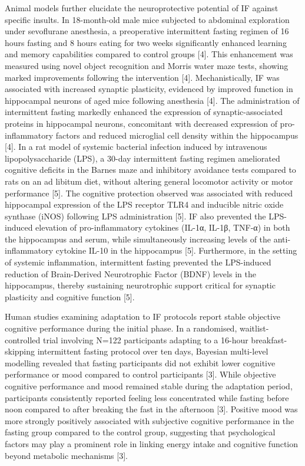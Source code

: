 \documentclass[conference]{IEEEtran}
\begin{document}
Animal models further elucidate the neuroprotective potential of IF against specific insults. In 18-month-old male mice subjected to abdominal exploration under sevoflurane anesthesia, a preoperative intermittent fasting regimen of 16 hours fasting and 8 hours eating for two weeks significantly enhanced learning and memory capabilities compared to control groups [4]. This enhancement was measured using novel object recognition and Morris water maze tests, showing marked improvements following the intervention [4]. Mechanistically, IF was associated with increased synaptic plasticity, evidenced by improved function in hippocampal neurons of aged mice following anesthesia [4]. The administration of intermittent fasting markedly enhanced the expression of synaptic-associated proteins in hippocampal neurons, concomitant with decreased expression of pro-inflammatory factors and reduced microglial cell density within the hippocampus [4]. In a rat model of systemic bacterial infection induced by intravenous lipopolysaccharide (LPS), a 30-day intermittent fasting regimen ameliorated cognitive deficits in the Barnes maze and inhibitory avoidance tests compared to rats on an ad libitum diet, without altering general locomotor activity or motor performance [5]. The cognitive protection observed was associated with reduced hippocampal expression of the LPS receptor TLR4 and inducible nitric oxide synthase (iNOS) following LPS administration [5]. IF also prevented the LPS-induced elevation of pro-inflammatory cytokines (IL-1α, IL-1β, TNF-α) in both the hippocampus and serum, while simultaneously increasing levels of the anti-inflammatory cytokine IL-10 in the hippocampus [5]. Furthermore, in the setting of systemic inflammation, intermittent fasting prevented the LPS-induced reduction of Brain-Derived Neurotrophic Factor (BDNF) levels in the hippocampus, thereby sustaining neurotrophic support critical for synaptic plasticity and cognitive function [5].

Human studies examining adaptation to IF protocols report stable objective cognitive performance during the initial phase. In a randomised, waitlist-controlled trial involving N=122 participants adapting to a 16-hour breakfast-skipping intermittent fasting protocol over ten days, Bayesian multi-level modelling revealed that fasting participants did not exhibit lower cognitive performance or mood compared to control participants [3]. While objective cognitive performance and mood remained stable during the adaptation period, participants consistently reported feeling less concentrated while fasting before noon compared to after breaking the fast in the afternoon [3]. Positive mood was more strongly positively associated with subjective cognitive performance in the fasting group compared to the control group, suggesting that psychological factors may play a prominent role in linking energy intake and cognitive function beyond metabolic mechanisms [3].
\end{document}
